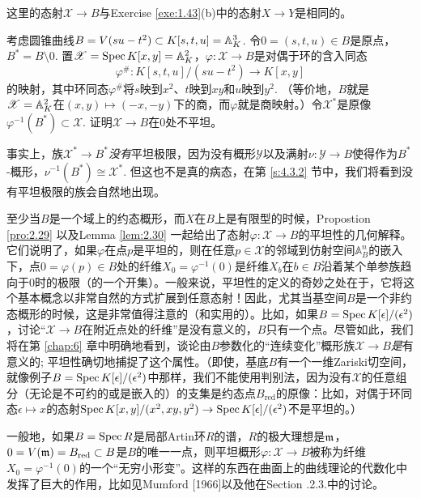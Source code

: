 这里的态射$\mathscr{X}\to B$与Exercise \ref{exe:1.43}(b)中的态射$X\to Y$是相同的。

\begin{exe}
考虑圆锥曲线$B=V(su-t^2)\subset K[s,t,u]=\mathbb{A}_K^3$. 令$0=(s,t,u)\in B$是原点，$B^*=B\setminus {0}$. 置$\mathscr{X}=\operatorname{Spec} K[x,y]=\mathbb{A}_K^2$，$\varphi:\mathscr{X}\to B$是对偶于环的含入同态
\[
	\varphi^{\#}:K[s,t,u]/(su-t^2)\to K[x,y]
\]
的映射，其中环同态$\varphi^{\#}$将$s$映到$x^2$、$t$映到$xy$和$u$映到$y^2$. （等价地，$B$就是$\mathscr{X}=\mathbb{A}_K^2$在$(x,y)\mapsto (-x,-y)$下的商，而$\varphi$就是商映射。）令$\mathscr{X}^*$是原像$\varphi^{-1}(B^*)\subset \mathscr{X}$. 证明$\mathscr{X}\to B$在$0$处不平坦。
\end{exe}

事实上，族$\mathscr{X}^*\to B^*$\textit{没有}平坦极限，因为没有概形$\mathscr{Y}$以及满射$\nu:\mathscr{Y}\to B$使得作为$B^*$\hyp 概形，$\nu^{-1}(B^*)\cong \mathscr{X}^*$. 但这也不是真的病态，在第 \ref{s:4.3.2} 节中，我们将看到没有平坦极限的族会自然地出现。

至少当$B$是一个域上的约态概形，而$X$在$B$上是有限型的时候，Propostion \ref{pro:2.29} 以及Lemma \ref{lem:2.30} 一起给出了态射$\varphi:\mathscr{X}\to B$的平坦性的几何解释。它们说明了，如果$\varphi$在点$p$是平坦的，则在任意$p\in\mathscr{X}$的邻域到仿射空间$\mathbb{A}_B^n$的嵌入下，点$0=\varphi(p)\in B$处的纤维$X_0=\varphi^{-1}(0)$是纤维$X_b$在$b\in B$沿着某个单参族趋向于$0$时的极限（的一个开集）。一般来说，平坦性的定义的奇妙之处在于，它将这个基本概念以非常自然的方式扩展到任意态射！因此，尤其当基空间$B$是一个非约态概形的时候，这是非常值得注意的（和实用的）。比如，如果$B=\operatorname{Spec} K[\epsilon]/(\epsilon^2)$，讨论“$\mathscr{X}\to B$在附近点处的纤维”是没有意义的，$B$只有一个点。尽管如此，我们将在第 \ref{chap:6} 章中明确地看到，谈论由$B$参数化的“连续变化”概形族$\mathscr{X}\to B$\textit{是}有意义的; 平坦性确切地捕捉了这个属性。（即使，基底$B$有一个一维Zariski切空间，就像例子$B=\operatorname{Spec} K[\epsilon]/(\epsilon^2)$中那样，我们不能使用判别法，因为没有$\mathscr{X}$的任意组分（无论是不可约的或是嵌入的）的支集是约态点$B_{\text{red}}$的原像：比如，对偶于环同态$\epsilon\mapsto x$的态射$\operatorname{Spec} K[x,y]/(x^2,xy,y^2)\to \operatorname{Spec} K[\epsilon]/(\epsilon^2)$不是平坦的。）

一般地，如果$B=\operatorname{Spec} R$是局部Artin环$R$的谱，$R$的极大理想是$\mathfrak{m}$，$0=V(\mathfrak{m})=B_{\text{red}}\subset B$是$B$的唯一一点，则平坦概形$\varphi:\mathscr{X}\to B$被称为纤维$X_0=\varphi^{-1}(0)$的一个“无穷小形变”。这样的东西在曲面上的曲线理论的代数化中发挥了巨大的作用，比如见Mumford [1966]以及他在Section \uppercase\expandafter{}.2.3.中的讨论。

